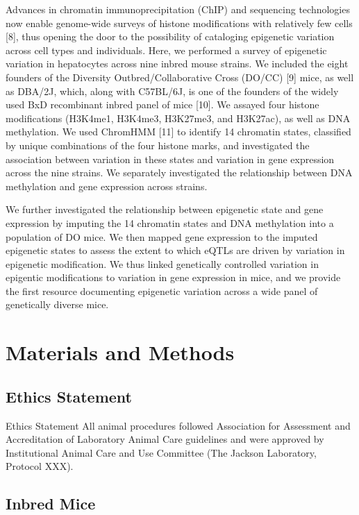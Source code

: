 \documentclass[10pt,letterpaper]{article}
\begin{document}
Advances in chromatin immunoprecipitation (ChIP) and sequencing
technologies now enable genome-wide surveys of histone modifications
with relatively few cells {[}8{]}, thus opening the door to the
possibility of cataloging epigenetic variation across cell types and
individuals. Here, we performed a survey of epigenetic variation in
hepatocytes across nine inbred mouse strains. We included the eight
founders of the Diversity Outbred/Collaborative Cross (DO/CC) {[}9{]}
mice, as well as DBA/2J, which, along with C57BL/6J, is one of the
founders of the widely used BxD recombinant inbred panel of mice
{[}10{]}. We assayed four histone modifications (H3K4me1, H3K4me3,
H3K27me3, and H3K27ac), as well as DNA methylation. We used ChromHMM
{[}11{]} to identify 14 chromatin states, classified by unique
combinations of the four histone marks, and investigated the association
between variation in these states and variation in gene expression
across the nine strains. We separately investigated the relationship
between DNA methylation and gene expression across strains.

We further investigated the relationship between epigenetic state and
gene expression by imputing the 14 chromatin states and DNA methylation
into a population of DO mice. We then mapped gene expression to the
imputed epigenetic states to assess the extent to which eQTLs are driven
by variation in epigenetic modification. We thus linked genetically
controlled variation in epigentic modifications to variation in gene
expression in mice, and we provide the first resource documenting
epigenetic variation across a wide panel of genetically diverse mice.

\hypertarget{materials-and-methods}{%
\section{Materials and Methods}\label{materials-and-methods}}

\hypertarget{ethics-statement}{%
\subsection{Ethics Statement}\label{ethics-statement}}

Ethics Statement All animal procedures followed Association for
Assessment and Accreditation of Laboratory Animal Care guidelines and
were approved by Institutional Animal Care and Use Committee (The
Jackson Laboratory, Protocol XXX).

\hypertarget{inbred-mice}{%
\subsection{Inbred Mice}\label{inbred-mice}}
\end{document}
